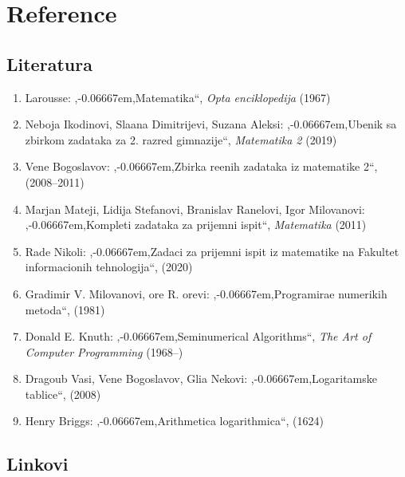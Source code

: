 \documentclass[12pt, twoside, a4paper]{article}
\def\navod#1{\relax,\kern-0.06667em,\relax#1\relax``\relax}
\begin{document}
\section{Reference}

\subsection{Literatura}



\def\lit#1#2#3(#4){\item 
#1: \navod{#2}, {\sl#3\/} (#4)}
\renewcommand{\labelenumi}{[{\it\arabic{enumi}\/}]}

\begin{enumerate}
\lit{Larousse}{Matematika}{Op{\sv}ta enciklopedija}(1967)
\lit{Neboj{\sv}a Ikodinovi{\cc}, Sla{\dj}ana Dimitrijevi{\cc}, Suzana Aleksi{\cc}}{U{\dz}benik sa
zbirkom zadataka za 2. razred gimnazije}{Matematika 2}(2019)
\lit{Vene Bogoslavov}{Zbirka re\sv enih zadataka iz matematike 2}{}(2008--2011)
\lit{Marjan Mateji\cc, Lidija Stefanovi\cc, Branislav Ran\dj elovi\cc, Igor Milovanovi\cc}{Kom\-ple\-ti
zadataka za prijemni ispit}{Matematika}(2011)
\lit{Rade Nikoli{\cc}}{Zadaci za prijemni ispit iz matematike na Fakultet informacionih tehnologija}{}(2020)
\lit{Gradimir V. Milovanovi{\cc}, {\Dj}or{\dj}e R. {\Dj}or{\dj}evi{\cc}}{Programira{\nj}e numeri{\cv}kih metoda}{}(1981)
\lit{Donald E. Knuth}{Seminumerical Algorithms}{The Art of Computer Programming}(1968--)
\lit{Drago{\lj}ub Vasi{\cc}, Vene Bogoslavov, Gli{\sv}a Ne{\sv}kovi{\cc}}{Logaritamske tablice}{}(2008)
\lit{Henry Briggs}{Arithmetica logarithmica}{}(1624)
\end{enumerate}

\subsection{Linkovi}

\def\link#1#2{\item\href{#1}{#2\hfill\break{\footnotesize\tt#1}}}
\end{document}
